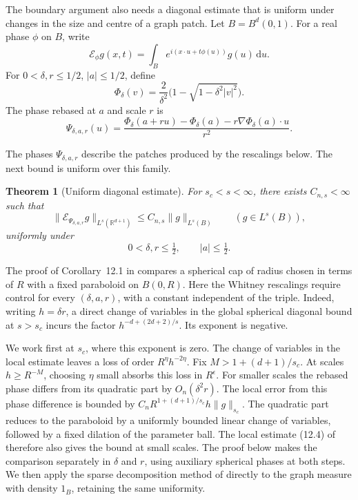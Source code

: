 \documentclass[11pt]{article}
\numberwithin{equation}{section}
\newtheorem{theorem}{Theorem}[section]
\newcommand{\R}{\mathbb{R}}
\newcommand{\dd}{\,\mathrm{d}}
\newcommand{\norm}[1]{\lVert #1\rVert}
\newcommand{\abs}[1]{\lvert #1\rvert}
\begin{document}
The boundary argument also needs a diagonal estimate that is uniform
under changes in the size and centre of a graph patch. Let \(B=B^d(0,1)\).
For a real phase \(\phi\) on \(B\), write
\[
 \mathcal E_\phi g(x,t)=\int_B e^{i(x\cdot u+t\phi(u))}g(u)\dd u.
\]
For \(0<\delta,r\le1/2\), \(\abs{a}\le1/2\), define
\begin{equation}\label{eq:spherical-graph-phase}
 \Phi_\delta(v)=\frac{2}{\delta^2}
       \bigl(1-\sqrt{1-\delta^2\abs{v}^2}\bigr).
\end{equation}
The phase rebased at \(a\) and scale \(r\) is
\begin{equation}\label{eq:rebased-graph-phase}
 \Psi_{\delta,a,r}(u)
 =\frac{\Phi_\delta(a+ru)-\Phi_\delta(a)
         -r\nabla\Phi_\delta(a)\cdot u}{r^2}.
\end{equation}

The phases \(\Psi_{\delta,a,r}\) describe the patches produced by the
rescalings below. The next bound is uniform over this family.

\begin{theorem}[Uniform diagonal estimate]\label{input:diagonal}
For \(s_c<s<\infty\), there exists \(C_{n,s}<\infty\) such that
\[
 \norm{\mathcal E_{\Psi_{\delta,a,r}}g}_{L^s(\R^{d+1})}
 \le C_{n,s}\norm{g}_{L^s(B)}
 \qquad(g\in L^s(B)),
\]
uniformly under
\[
 0<\delta,r\le\tfrac12,\qquad |a|\le\tfrac12.
\]
\end{theorem}

The proof of Corollary~12.1 in \cite{openai-local-smoothing} compares
a spherical cap of radius chosen in terms of \(R\) with a fixed
paraboloid on \(B(0,R)\). Here the Whitney rescalings require control
for every \((\delta,a,r)\), with a constant independent of the triple.
Indeed, writing \(h=\delta r\), a direct change of variables in the
global spherical diagonal bound at \(s>s_c\) incurs the factor
\(h^{-d+(2d+2)/s}\). Its exponent is negative.

We work first at \(s_c\), where this exponent is zero. The change
of variables in the local estimate leaves a loss of order
\(R^\eta h^{-2\eta}\). Fix \(M>1+(d+1)/s_c\). At scales
\(h\ge R^{-M}\), choosing \(\eta\) small absorbs this loss in
\(R^\epsilon\). For smaller scales the rebased phase differs from its
quadratic part by \(O_n(\delta^2 r)\). The local error from this phase
difference is bounded by \(C_n R^{1+(d+1)/s_c}h\norm{g}_{s_c}\).
The quadratic part reduces to the paraboloid by a uniformly bounded
linear change of variables, followed by a fixed dilation of the
parameter ball. The local estimate (12.4) of
\cite{openai-local-smoothing} therefore also gives the bound at small
scales. The proof below makes the comparison separately in \(\delta\) and
\(r\), using auxiliary spherical phases at both steps. We then apply
the sparse decomposition method of \cite{tao-eps} directly to the
graph measure with density \(1_B\), retaining the same uniformity.
\end{document}
